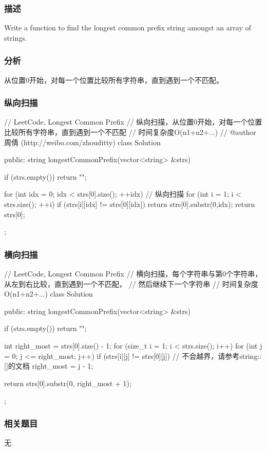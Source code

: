 \subsubsection{描述}
Write a function to find the longest common prefix string amongst an array of strings.


\subsubsection{分析}
从位置0开始，对每一个位置比较所有字符串，直到遇到一个不匹配。


\subsubsection{纵向扫描}
\begin{Code}
	// LeetCode, Longest Common Prefix
	// 纵向扫描，从位置0开始，对每一个位置比较所有字符串，直到遇到一个不匹配
	// 时间复杂度O(n1+n2+...)
	// @author 周倩 (http://weibo.com/zhouditty)
	class Solution {
		public:
		string longestCommonPrefix(vector<string> &strs) {
			if (strs.empty()) return "";
			
			for (int idx = 0; idx < strs[0].size(); ++idx) { // 纵向扫描
				for (int i = 1; i < strs.size(); ++i) {
					if (strs[i][idx] != strs[0][idx]) return strs[0].substr(0,idx);
				}
			}
			return strs[0];
		}
	};
\end{Code}


\subsubsection{横向扫描}
\begin{Code}
	// LeetCode, Longest Common Prefix
	// 横向扫描，每个字符串与第0个字符串，从左到右比较，直到遇到一个不匹配，
	// 然后继续下一个字符串
	// 时间复杂度O(n1+n2+...)
	class Solution {
		public:
		string longestCommonPrefix(vector<string> &strs) {
			if (strs.empty()) return "";
			
			int right_most = strs[0].size() - 1;
			for (size_t i = 1; i < strs.size(); i++)
			for (int j = 0; j <= right_most; j++)
			if (strs[i][j] != strs[0][j])  // 不会越界，请参考string::[]的文档
			right_most = j - 1;
			
			return strs[0].substr(0, right_most + 1);
		}
	};
\end{Code}


\subsubsection{相关题目}
\begindot
\item 无
\myenddot


